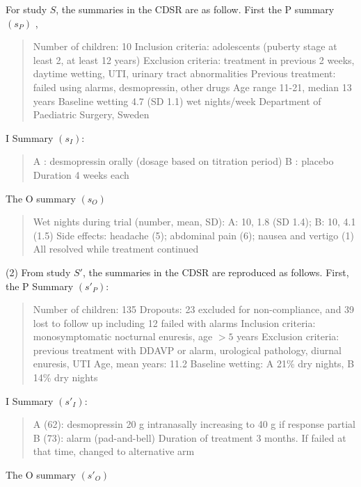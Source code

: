 \documentclass[11pt,a4paper]{article}
\begin{document}
For study $S$, the summaries in the CDSR are as follow. First the P summary $(s_P)$ ,

{\footnotesize \begin{quote} Number of children: 10 Inclusion criteria: adolescents (puberty stage at least 2, at least 12 years)  Exclusion criteria: treatment in previous 2 weeks, daytime wetting, UTI, urinary tract abnormalities  Previous treatment: failed using alarms, desmopressin, other drugs Age range 11-21, median 13 years Baseline wetting 4.7 (SD 1.1) wet nights/week Department of Paediatric Surgery, Sweden\end{quote}}

\noindent I Summary $(s_I)$: 

{\footnotesize \begin{quote} A : desmopressin orally (dosage based on titration period) B : placebo Duration 4 weeks each
\end{quote}}

\noindent The O summary $(s_O)$

{\footnotesize \begin{quote} Wet nights during trial (number, mean, SD): A: 10, 1.8 (SD 1.4); B: 10, 4.1 (1.5) Side effects: headache (5); abdominal pain (6); nausea and vertigo (1) All resolved while treatment continued \end{quote}}

\vspace{1em}
(2) From study $S'$, the summaries in the CDSR are reproduced as follows. First, the P Summary $(s'_P)$:

{\footnotesize \begin{quote} Number of children: 135 Dropouts: 23 excluded for non-compliance, and 39 lost to follow up including 12 failed with alarms Inclusion criteria: monosymptomatic nocturnal enuresis, age $>5$ years Exclusion criteria: previous treatment with DDAVP or alarm, urological pathology, diurnal enuresis, UTI Age, mean years: 11.2  Baseline wetting: A 21\% dry nights, B 14\% dry nights\end{quote}}

\noindent I Summary $(s'_I)$: 

{\footnotesize \begin{quote} A (62): desmopressin 20 g intranasally increasing to 40 g if response partial B (73): alarm (pad-and-bell) Duration of treatment 3 months. If failed at that time, changed to alternative arm\end{quote}}

\noindent The O summary $(s'_O)$
\end{document}
